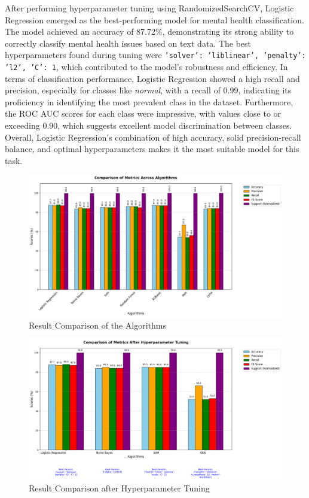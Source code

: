 \pagebreak

\noindent
After performing hyperparameter tuning using RandomizedSearchCV, Logistic Regression emerged as the best-performing model for mental health classification. The model achieved an accuracy of 87.72\%, demonstrating its strong ability to correctly classify mental health issues based on text data. The best hyperparameters found during tuning were \texttt{'solver': 'liblinear', 'penalty': 'l2', 'C': 1}, which contributed to the model's robustness and efficiency. In terms of classification performance, Logistic Regression showed a high recall and precision, especially for classes like \textit{normal}, with a recall of 0.99, indicating its proficiency in identifying the most prevalent class in the dataset. Furthermore, the ROC AUC scores for each class were impressive, with values close to or exceeding 0.90, which suggests excellent model discrimination between classes. Overall, Logistic Regression's combination of high accuracy, solid precision-recall balance, and optimal hyperparameters makes it the most suitable model for this task.


\begin{figure}[h!]  
    \centering
    \includegraphics[width=1.0\textwidth]{Images/ML GRAPH 1.png}  
    \caption{Result Comparison of the Algorithms}
    \label{dfdl145}  %
\end{figure}

\begin{figure}[h!]  
    \centering
    \includegraphics[width=1.0\textwidth]{Images/ML GRAPH 2 HT.png}  
    \caption{Result Comparison after Hyperparameter Tuning}
    \label{dfdl123}  %
\end{figure}


